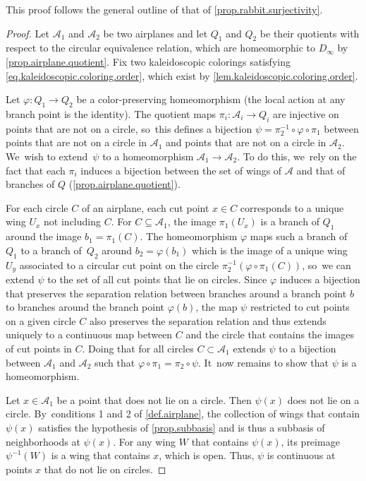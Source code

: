 \documentclass[JEP,XML,SOM,Unicode,NoFloatCountersInSection,published]{cedram}
\theoremstyle{plain}
\theoremstyle{definition}
\theoremstyle{remark}
\newcommand{\A}{\mathcal{A}}
\begin{document}
This proof follows the general outline of that of \cref{prop.rabbit.surjectivity}.

\begin{proof}
Let $\A_1$ and $\A_2$ be two airplanes and let $Q_1$ and $Q_2$ be their quotients with respect to the circular equivalence relation, which are homeomorphic to $D_\infty$ by \cref{prop.airplane.quotient}.
Fix two kaleidoscopic colorings satisfying \cref{eq.kaleidoscopic.coloring.order}, which exist by \cref{lem.kaleidoscopic.coloring.order}.

Let $\varphi\colon Q_1\to Q_2$ be a color-preserving homeomorphism (the local action at any branch point is the identity).
The quotient maps $\pi_i\colon\A_i\to Q_i$ are injective on points that are not on a circle, so~this defines a bijection $\psi=\pi_2^{-1}\circ \varphi\circ\pi_1$ between points that are not on a circle in $\A_1$ and points that are not on a circle in $\A_2$. We~wish to extend~$\psi$ to a homeomorphism $\A_1 \to \A_2$.
To do this, we~rely on the fact that each $\pi_i$ induces a bijection between the set of wings of $\A$ and that of branches of $Q$ (\cref{prop.airplane.quotient}).

For each circle $C$ of an airplane, each cut point $x \in C$ corresponds to a unique wing $U_x$ not including $C$.
For $C \subseteq \A_1$, the image $\pi_1(U_x)$ is a branch of $Q_1$ around the image $b_1 = \pi_1(C)$.
The homeomorphism $\varphi$ maps such a branch of $Q_1$ to a branch of~$Q_2$ around $b_2=\varphi(b_1)$ which is the image of a unique wing $U_y$ associated to a circular cut point on the circle $\pi_2^{-1}(\varphi\circ\pi_1(C))$, so~we can extend $\psi$ to the set of all cut points that lie on circles.
Since $\varphi$ induces a bijection that preserves the separation relation between branches around a branch point $b$ to branches around the branch point $\varphi(b)$, the map $\psi$ restricted to cut points on a given circle $C$ also preserves the separation relation and thus extends uniquely to a continuous map between $C$ and the circle that contains the images of cut points in $C$.
Doing that for all circles $C\subset \A_1$ extends $\psi$ to a bijection between $\A_1$ and $\A_2$ such that $\varphi \circ \pi_1 = \pi_2 \circ \psi$. It~now remains to show that $\psi$ is a homeomorphism.

Let $x \in \A_1$ be a point that does not lie on a circle.
Then $\psi(x)$ does not lie on a circle. By~conditions 1 and 2 of \cref{def.airplane}, the collection of wings that contain $\psi(x)$ satisfies the hypothesis of \cref{prop.subbasis} and is thus a subbasis of neighborhoods at $\psi(x)$.
For any wing $W$ that contains $\psi(x)$, its preimage $\psi^{-1}(W)$ is a wing that contains $x$, which is open.
Thus, $\psi$ is continuous at points $x$ that do not lie on circles.


\end{proof}
\end{document}
